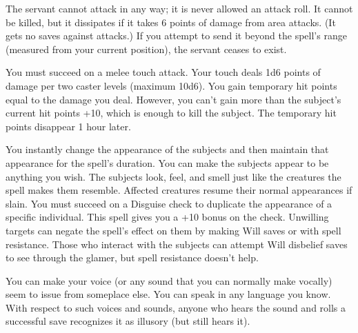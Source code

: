 \begin{multicols}{2}
\begin{small}
\smallskip\noindent The servant cannot attack in any way; it is never allowed an attack roll. It cannot be killed, but it dissipates if it takes 6 points of damage from area attacks. (It gets no saves against attacks.) If you attempt to send it beyond the spell's range (measured from your current position), the servant ceases to exist.


\noindent You must succeed on a melee touch attack. Your touch deals 1d6 points of damage per two caster levels (maximum 10d6). You gain temporary hit points equal to the damage you deal. However, you can't gain more than the subject's current hit points +10, which is enough to kill the subject. The temporary hit points disappear 1 hour later.

\noindent You instantly change the appearance of the subjects and then maintain that appearance for the spell's duration. You can make the subjects appear to be anything you wish. The subjects look, feel, and smell just like the creatures the spell makes them resemble. Affected creatures resume their normal appearances if slain. You must succeed on a Disguise check to duplicate the appearance of a specific individual. This spell gives you a +10 bonus on the check.
Unwilling targets can negate the spell's effect on them by making Will saves or with spell resistance. Those who interact with the subjects can attempt Will disbelief saves to see through the glamer, but spell resistance doesn't help.

\noindent You can make your voice (or any sound that you can normally make vocally) seem to issue from someplace else. You can speak in any language you know. With respect to such voices and sounds, anyone who hears the sound and rolls a successful save recognizes it as illusory (but still hears it).


\end{small}
\end{multicols}
